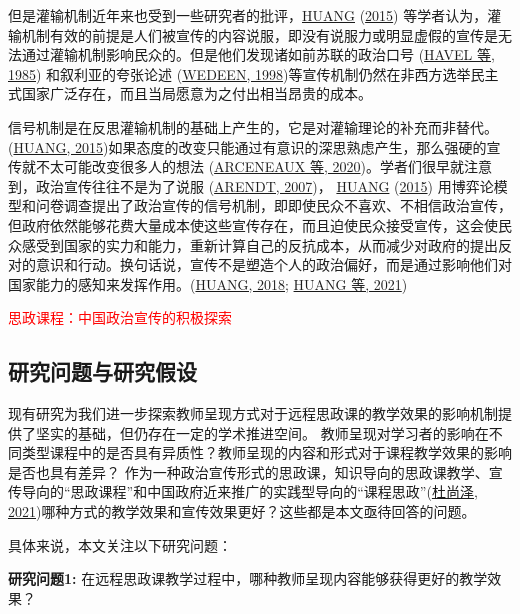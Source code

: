\documentclass[
  12pt,
]{ctexart}
\begin{document}
但是灌输机制近年来也受到一些研究者的批评，\protect\hyperlink{ref-Huang2015a}{HUANG} (\protect\hyperlink{ref-Huang2015a}{2015}) 等学者认为，灌输机制有效的前提是人们被宣传的内容说服，即没有说服力或明显虚假的宣传是无法通过灌输机制影响民众的。但是他们发现诸如前苏联的政治口号 (\protect\hyperlink{ref-HavelWilson1985}{HAVEL 等, 1985}) 和叙利亚的夸张论述 (\protect\hyperlink{ref-Wedeen1998}{WEDEEN, 1998})等宣传机制仍然在非西方选举民主式国家广泛存在，而且当局愿意为之付出相当昂贵的成本。

信号机制是在反思灌输机制的基础上产生的，它是对灌输理论的补充而非替代。(\protect\hyperlink{ref-Huang2015a}{HUANG, 2015})如果态度的改变只能通过有意识的深思熟虑产生，那么强硬的宣传就不太可能改变很多人的想法 (\protect\hyperlink{ref-ArceneauxTruex2020}{ARCENEAUX 等, 2020})。学者们很早就注意到，政治宣传往往不是为了说服 (\protect\hyperlink{ref-Arendt2007}{ARENDT, 2007})， \protect\hyperlink{ref-Huang2015a}{HUANG} (\protect\hyperlink{ref-Huang2015a}{2015}) 用博弈论模型和问卷调查提出了政治宣传的信号机制，即即使民众不喜欢、不相信政治宣传，但政府依然能够花费大量成本使这些宣传存在，而且迫使民众接受宣传，这会使民众感受到国家的实力和能力，重新计算自己的反抗成本，从而减少对政府的提出反对的意识和行动。换句话说，宣传不是塑造个人的政治偏好，而是通过影响他们对国家能力的感知来发挥作用。(\protect\hyperlink{ref-Huang2018}{HUANG, 2018}; \protect\hyperlink{ref-HuangCruz2021}{HUANG 等, 2021})

\textcolor{red}{思政课程：中国政治宣传的积极探索}

\hypertarget{ux7814ux7a76ux95eeux9898ux4e0eux7814ux7a76ux5047ux8bbe}{%
\subsection{研究问题与研究假设}\label{ux7814ux7a76ux95eeux9898ux4e0eux7814ux7a76ux5047ux8bbe}}

现有研究为我们进一步探索教师呈现方式对于远程思政课的教学效果的影响机制提供了坚实的基础，但仍存在一定的学术推进空间。
教师呈现对学习者的影响在不同类型课程中的是否具有异质性？教师呈现的内容和形式对于课程教学效果的影响是否也具有差异？
作为一种政治宣传形式的思政课，知识导向的思政课教学、宣传导向的``思政课程''和中国政府近来推广的实践型导向的``课程思政''(\protect\hyperlink{ref-DuShangZe2021}{杜尚泽, 2021})哪种方式的教学效果和宣传效果更好？这些都是本文亟待回答的问题。

具体来说，本文关注以下研究问题：

\textbf{研究问题1:} 在远程思政课教学过程中，哪种教师呈现内容能够获得更好的教学效果？
\end{document}
